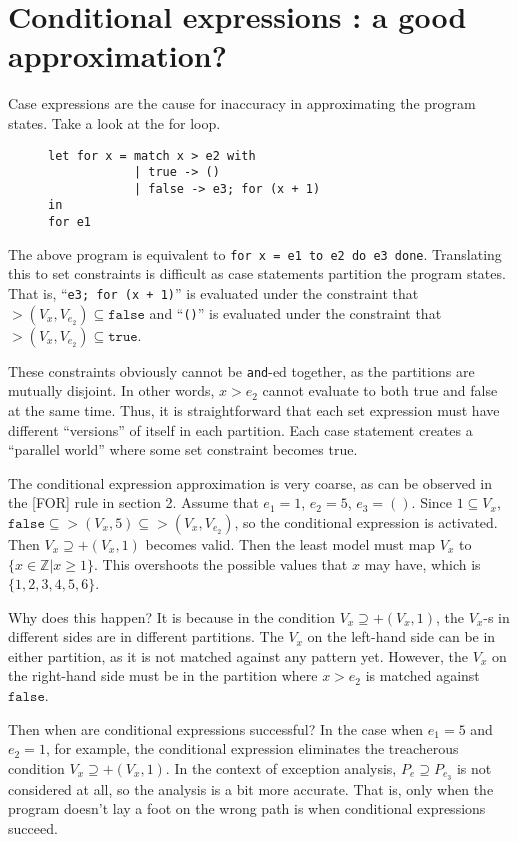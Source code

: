 \documentclass{article}
\newcommand\vbar{|}
\begin{document}
\section{Conditional expressions : a good approximation?}

Case expressions are the cause for inaccuracy in approximating the program states. Take a look at the for loop.
\begin{figure}[htb]
\centering
\begin{BVerbatim}
let for x = match x > e2 with
            | true -> ()
            | false -> e3; for (x + 1)
in
for e1
\end{BVerbatim}
\end{figure}

The above program is equivalent to \texttt{for x = e1 to e2 do e3 done}. Translating this to set constraints is difficult as case statements partition the program states.
That is, ``\texttt{e3; for (x + 1)}'' is evaluated under the constraint that $>(V_{x},V_{e_{2}})\subseteq \mathtt{false}$ and ``\texttt{()}'' is evaluated under the constraint that $>(V_{x}, V_{e_{2}})\subseteq \mathtt{true}$.

These constraints obviously cannot be \texttt{and}-ed together, as the partitions are mutually disjoint. In other words, $x > e_{2}$ cannot evaluate to both true and false at the same time. Thus, it is straightforward that each set expression must have different ``versions'' of itself in each partition. Each case statement creates a ``parallel world'' where some set constraint becomes true.

The conditional expression approximation is very coarse, as can be observed in the [FOR] rule in section 2. Assume that $e_{1}=1$, $e_{2}=5$, $e_{3}=()$. Since $1\subseteq V_{x}$, $\mathtt{false}\subseteq >(V_{x}, 5)\subseteq >(V_{x}, V_{e_{2}})$, so the conditional expression is activated. Then $V_{x}\supseteq +(V_{x}, 1)$ becomes valid. Then the least model must map $V_{x}$ to $\{x\in\mathbb{Z}\vbar x \ge 1\}$. This overshoots the possible values that $x$ may have, which is $\{1, 2, 3, 4, 5, 6\}$.

Why does this happen? It is because in the condition $V_{x}\supseteq +(V_{x}, 1)$, the $V_{x}$-s in different sides are in different partitions. The $V_{x}$ on the left-hand side can be in either partition, as it is not matched against any pattern yet. However, the $V_{x}$ on the right-hand side must be in the partition where $x>e_{2}$ is matched against $\mathtt{false}$.

Then when are conditional expressions successful? In the case when $e_{1}=5$ and $e_{2}=1$, for example, the conditional expression eliminates the treacherous condition $V_{x}\supseteq +(V_{x}, 1)$. In the context of exception analysis, $P_{e}\supseteq P_{e_{3}}$ is not considered at all, so the analysis is a bit more accurate. That is, only when the program doesn't lay a foot on the wrong path is when conditional expressions succeed.
\end{document}
